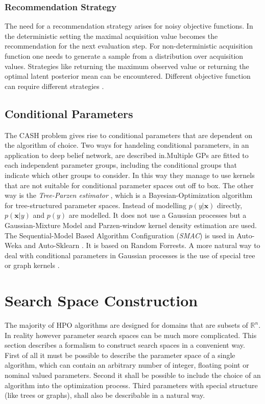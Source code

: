 \documentclass[english]{article}
\newcommand{\x}{\mathbf{x}}
\begin{document}
\subsubsection*{Recommendation Strategy}
The need for a recommendation strategy arises for noisy objective functions. In the deterministic setting the maximal acquisition value becomes the recommendation for the next evaluation step. For non-deterministic acquisition function one needs to generate a sample from a distribution over acquisition values. Strategies like returning the maximum observed value or returning the optimal latent posterior mean can be encountered. Different objective function can require different strategies \cite{hoffman_modular_2014}.

\subsection{Conditional Parameters}
The CASH problem gives rise to conditional parameters that are dependent on the algorithm of choice.
Two ways for handeling conditional parameters, in an application to deep belief network, are described in\cite{bergstra_algorithms_2011}.Multiple GPs are fitted to each independent parameter groups, including the conditional groups that indicate which other groups to consider. In this way they manage to use kernels that are not suitable for conditional parameter spaces out off to box.
The other way is the \textit{Tree-Parzen estimator} \cite{bergstra_algorithms_2011}, which is a Bayesian-Optimization algorithm for tree-structured parameter spaces. Instead of modelling $p(y|\x)$ directly, $p(\x|y)$ and $p(y)$ are modelled. It does not use a Gaussian processes but a Gaussian-Mixture Model and Parzen-window kernel density estimation are used.
The Sequential-Model Based Algorithm Configuration (\textit{SMAC}) \cite{hutter_sequential_2011} is used in Auto-Weka \cite{thornton_auto-weka:_2013} and Auto-Sklearn \cite{feurer_efficient_2015}. It is based on Random Forrests.
A more natural way to deal with conditional parameters in Gaussian processes is the use of special tree or graph kernels \cite{swersky_raiders_2014, chandar_hierarchical_2016}.


\section{Search Space Construction}
\label{construction}
The majority of HPO algorithms are designed for domains that are subsets of $\mathbb{R}^n$. In reality however parameter search spaces can be much more complicated. This section describes a formalism to construct search spaces in a convenient way. First of all it must be possible to describe the parameter space of a single algorithm, which can contain an arbitrary number of integer, floating point or nominal valued parameters. Second it shall be possible to include the choice of an algorithm into the optimization process. Third parameters with special structure (like trees or graphs), shall also be describable in a natural way.
\end{document}
